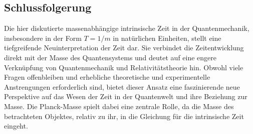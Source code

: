 \subsection{Schlussfolgerung}

Die hier diskutierte massenabhängige intrinsische Zeit in der Quantenmechanik, insbesondere in der Form $T=1/m$ in natürlichen Einheiten, stellt eine tiefgreifende Neuinterpretation der Zeit dar. Sie verbindet die Zeitentwicklung direkt mit der Masse des Quantensystems und deutet auf eine engere Verknüpfung von Quantenmechanik und Relativitätstheorie hin.  Obwohl viele Fragen offenbleiben und erhebliche theoretische und experimentelle Anstrengungen erforderlich sind, bietet dieser Ansatz eine faszinierende neue Perspektive auf das Wesen der Zeit in der Quantenwelt und ihre Beziehung zur Masse. Die Planck-Masse spielt dabei eine zentrale Rolle, da die Masse des betrachteten Objektes, relativ zu ihr, in die Gleichung für die intrinsische Zeit eingeht.